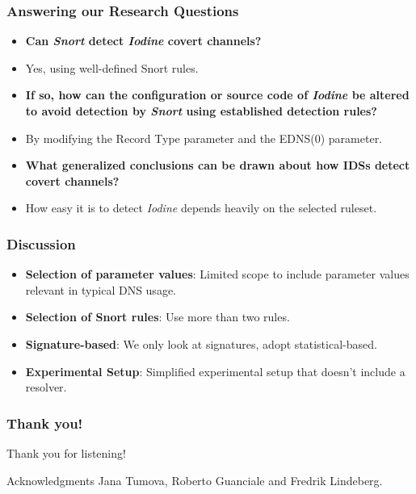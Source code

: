 \documentclass{beamer}
\begin{document}
\begin{frame}
\frametitle{Answering our Research Questions}
  \begin{itemize}
    \item<1-> \textbf{Can \textit{Snort} detect \textit{Iodine} covert channels?}
    \item<2-> Yes, using well-defined Snort rules.

    \item<3-> \textbf{If so, how can the configuration or source code of \textit{Iodine} be altered to avoid detection by \textit{Snort} using established detection rules?}
    \item<4-> By modifying the Record Type parameter and the EDNS(0) parameter.

    \item<5-> \textbf{What generalized conclusions can be drawn about how IDSs detect covert channels?}
    \item<6-> How easy it is to detect \textit{Iodine} depends heavily on the selected ruleset.
  \end{itemize}
\end{frame}


\begin{frame}
\frametitle{Discussion}

\begin{itemize}
    \item<1-> \textbf{Selection of parameter values}: Limited scope to include parameter values relevant in typical DNS usage.
    \item<2-> \textbf{Selection of Snort rules}: Use more than two rules.
    \item<3-> \textbf{Signature-based}: We only look at signatures, adopt statistical-based.
    \item<4-> \textbf{Experimental Setup}: Simplified experimental setup that doesn't include a resolver.
\end{itemize}

\end{frame}


\begin{frame}
\frametitle{Thank you!}

Thank you for listening!

\begin{alertblock}{Acknowledgments}
Jana Tumova, Roberto Guanciale and Fredrik Lindeberg.
\end{alertblock}

\end{frame}
\end{document}
